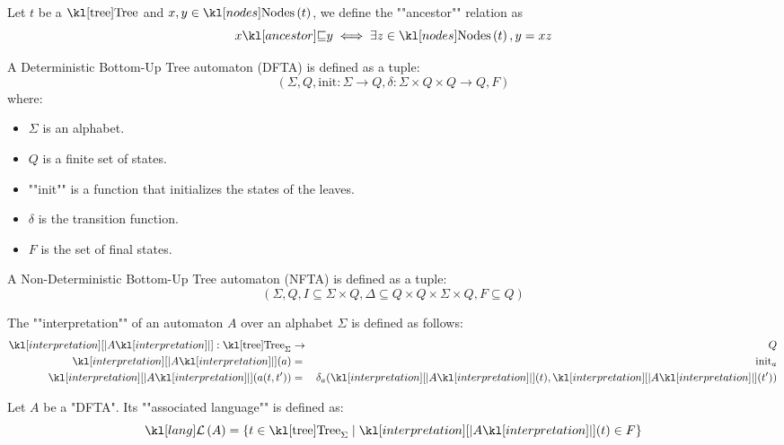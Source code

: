 \documentclass{article}
\begin{document}
\begin{definition}
	Let $t$ be a $\tree$ and $x, y \in \nodes t$, we define the ""ancestor"" relation as
	$$ \ancestor x y \iff \exists z \in \nodes t, y = xz$$
\end{definition}

\begin{definition}
	A Deterministic Bottom-Up Tree automaton (DFTA) is defined as a tuple:
	$$ (\Sigma, Q, \text{init} : \Sigma \to Q, \delta : \Sigma \times Q \times Q \to Q, F) $$
	where:
	\begin{itemize}
		\item $\Sigma$ is an alphabet.
		\item $Q$ is a finite set of states.
		\item ""init"" is a function that initializes the states of the leaves.
		\item $\delta$ is the transition function.
		\item $F$ is the set of final states.
	\end{itemize}
\end{definition}

\begin{definition}
	A Non-Deterministic Bottom-Up Tree automaton (NFTA) is defined as a tuple:
	$$ (\Sigma, Q, I \subseteq \Sigma \times Q, \Delta \subseteq Q \times Q \times \Sigma \times Q, F \subseteq Q) $$
\end{definition}

\begin{definition}
	The ""interpretation"" of an automaton $A$ over an alphabet $\Sigma$ is defined as follows:
	\begin{eqnarray*}
		\interpret A : \tree_{\Sigma} &\to& Q \\
		\interpret A (a) &=& \text{init}_a \\
		\interpret A (a(t,t')) &=& \delta_a (\interpret A (t), \interpret A (t'))
	\end{eqnarray*}
\end{definition}

\begin{definition}
	Let $A$ be a "DFTA". Its ""associated language"" is defined as:
	$$\lang A = \setdef {t \in \tree_{\Sigma}} {\interpret A (t) \in F}$$
\end{definition}
\end{document}
